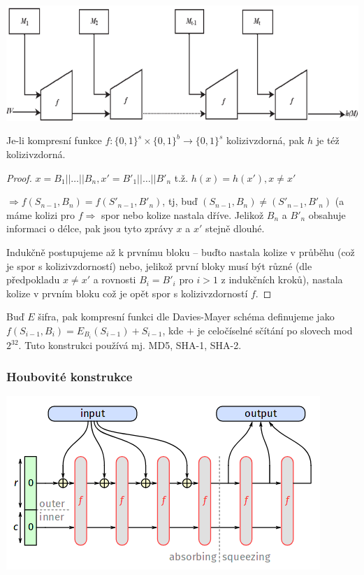 \begin{center}
	\includegraphics[width=0.5\linewidth]{MD.png}
\end{center}

\begin{thm}
	Je-li kompresní funkce $f:\{0,1\}^s\times\{0,1\}^b\rightarrow\{0,1\}^s$ kolizivzdorná, pak $h$ je též kolizivzdorná.
	\begin{proof}
		$x=B_1||\dots||B_n,x'=B'_1||\dots||B'_n$ t.ž. $h(x)=h(x'), x\neq x'$
		
		$\Rightarrow f(S_{n-1},B_n)=f(S'_{n-1},B'_n)$, tj, buď $(S_{n-1},B_n)\neq(S'_{n-1},B'_n)$ (a máme kolizi pro $f \Rightarrow$ spor nebo kolize nastala dříve. Jelikož $B_n$ a $B'_n$ obsahuje informaci o délce, pak jsou tyto zprávy $x$ a $x'$ stejně dlouhé.

		Indukčně postupujeme až k prvnímu bloku -- buďto nastala kolize v průběhu (což je spor s kolizivzdorností) nebo, jelikož první bloky musí být různé (dle předpokladu $x\neq x'$ a rovnosti $B_i=B'_i$ pro $i>1$ z indukčních kroků), nastala kolize v prvním bloku což je opět spor s kolizivzdorností $f$.
	\end{proof}
\end{thm}

\begin{rem}
	Buď $E$ šifra, pak kompresní funkci dle Davies-Mayer schéma definujeme jako $f(S_{i-1},B_i)=E_{B_i}(S_{i-1})+S_{i-1}$, kde $+$ je celočíselné sčítání po slovech mod $2^{32}$. Tuto konstrukci používá mj. MD5, SHA-1, SHA-2.
\end{rem}

\subsubsection*{Houbovité konstrukce}
\begin{center}
	\includegraphics[width=\linewidth]{sponge.png}
\end{center}

